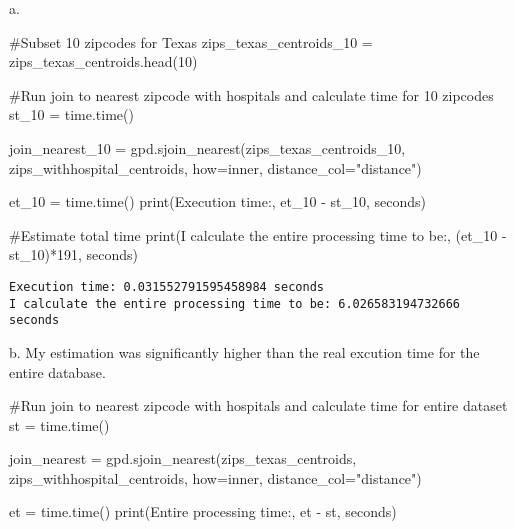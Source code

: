 \documentclass[
  letterpaper,
  DIV=11,
  numbers=noendperiod]{scrartcl}
\newenvironment{Shaded}{\begin{snugshade}}{\end{snugshade}}
\newcommand{\BuiltInTok}[1]{\textcolor[rgb]{0.00,0.23,0.31}{#1}}
\newcommand{\CommentTok}[1]{\textcolor[rgb]{0.37,0.37,0.37}{#1}}
\newcommand{\DecValTok}[1]{\textcolor[rgb]{0.68,0.00,0.00}{#1}}
\newcommand{\NormalTok}[1]{\textcolor[rgb]{0.00,0.23,0.31}{#1}}
\newcommand{\OperatorTok}[1]{\textcolor[rgb]{0.37,0.37,0.37}{#1}}
\newcommand{\StringTok}[1]{\textcolor[rgb]{0.13,0.47,0.30}{#1}}
\begin{document}
\hfill\break
a.

\begin{Shaded}
\begin{Highlighting}[]
\CommentTok{\#Subset 10 zipcodes for Texas}
\NormalTok{zips\_texas\_centroids\_10 }\OperatorTok{=}\NormalTok{ zips\_texas\_centroids.head(}\DecValTok{10}\NormalTok{)}

\CommentTok{\#Run join to nearest zipcode with hospitals and calculate time for 10 zipcodes}
\NormalTok{st\_10 }\OperatorTok{=}\NormalTok{ time.time()}

\NormalTok{join\_nearest\_10 }\OperatorTok{=}\NormalTok{ gpd.sjoin\_nearest(zips\_texas\_centroids\_10, zips\_withhospital\_centroids, how}\OperatorTok{=}\StringTok{\textquotesingle{}inner\textquotesingle{}}\NormalTok{, distance\_col}\OperatorTok{=}\StringTok{"distance"}\NormalTok{)}

\NormalTok{et\_10 }\OperatorTok{=}\NormalTok{ time.time()}
\BuiltInTok{print}\NormalTok{(}\StringTok{\textquotesingle{}Execution time:\textquotesingle{}}\NormalTok{, et\_10 }\OperatorTok{{-}}\NormalTok{ st\_10, }\StringTok{\textquotesingle{}seconds\textquotesingle{}}\NormalTok{)}

\CommentTok{\#Estimate total time}
\BuiltInTok{print}\NormalTok{(}\StringTok{\textquotesingle{}I calculate the entire processing time to be:\textquotesingle{}}\NormalTok{, (et\_10 }\OperatorTok{{-}}\NormalTok{ st\_10)}\OperatorTok{*}\DecValTok{191}\NormalTok{, }\StringTok{\textquotesingle{}seconds\textquotesingle{}}\NormalTok{)}
\end{Highlighting}
\end{Shaded}

\begin{verbatim}
Execution time: 0.031552791595458984 seconds
I calculate the entire processing time to be: 6.026583194732666 seconds
\end{verbatim}

\hfill\break
b. My estimation was significantly higher than the real excution time
for the entire database.

\begin{Shaded}
\begin{Highlighting}[]
\CommentTok{\#Run join to nearest zipcode with hospitals and calculate time for entire dataset}
\NormalTok{st }\OperatorTok{=}\NormalTok{ time.time()}

\NormalTok{join\_nearest }\OperatorTok{=}\NormalTok{ gpd.sjoin\_nearest(zips\_texas\_centroids, zips\_withhospital\_centroids, how}\OperatorTok{=}\StringTok{\textquotesingle{}inner\textquotesingle{}}\NormalTok{, distance\_col}\OperatorTok{=}\StringTok{"distance"}\NormalTok{)}

\NormalTok{et }\OperatorTok{=}\NormalTok{ time.time()}
\BuiltInTok{print}\NormalTok{(}\StringTok{\textquotesingle{}Entire processing time:\textquotesingle{}}\NormalTok{, et }\OperatorTok{{-}}\NormalTok{ st, }\StringTok{\textquotesingle{}seconds\textquotesingle{}}\NormalTok{)}
\end{Highlighting}
\end{Shaded}
\end{document}
